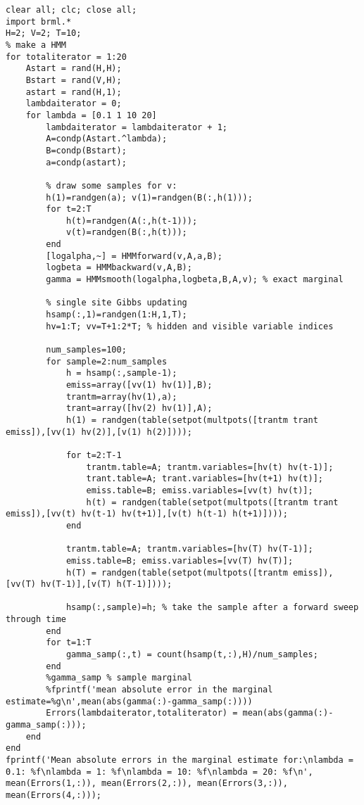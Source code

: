 \documentclass[11pt,a4paper,oneside]{report}
\begin{document}
\begin{lstlisting}
clear all; clc; close all;
import brml.*
H=2; V=2; T=10;
% make a HMM
for totaliterator = 1:20
    Astart = rand(H,H);
    Bstart = rand(V,H);
    astart = rand(H,1);
    lambdaiterator = 0;
    for lambda = [0.1 1 10 20]
        lambdaiterator = lambdaiterator + 1;
        A=condp(Astart.^lambda);
        B=condp(Bstart);
        a=condp(astart);

        % draw some samples for v:
        h(1)=randgen(a); v(1)=randgen(B(:,h(1)));
        for t=2:T
            h(t)=randgen(A(:,h(t-1)));  
            v(t)=randgen(B(:,h(t)));
        end
        [logalpha,~] = HMMforward(v,A,a,B); 
        logbeta = HMMbackward(v,A,B);
        gamma = HMMsmooth(logalpha,logbeta,B,A,v); % exact marginal

        % single site Gibbs updating
        hsamp(:,1)=randgen(1:H,1,T);
        hv=1:T; vv=T+1:2*T; % hidden and visible variable indices

        num_samples=100;
        for sample=2:num_samples
            h = hsamp(:,sample-1);
            emiss=array([vv(1) hv(1)],B);
            trantm=array(hv(1),a);
            trant=array([hv(2) hv(1)],A);
            h(1) = randgen(table(setpot(multpots([trantm trant emiss]),[vv(1) hv(2)],[v(1) h(2)])));

            for t=2:T-1
                trantm.table=A; trantm.variables=[hv(t) hv(t-1)];
                trant.table=A; trant.variables=[hv(t+1) hv(t)];
                emiss.table=B; emiss.variables=[vv(t) hv(t)];
                h(t) = randgen(table(setpot(multpots([trantm trant emiss]),[vv(t) hv(t-1) hv(t+1)],[v(t) h(t-1) h(t+1)])));
            end

            trantm.table=A; trantm.variables=[hv(T) hv(T-1)];
            emiss.table=B; emiss.variables=[vv(T) hv(T)];
            h(T) = randgen(table(setpot(multpots([trantm emiss]),[vv(T) hv(T-1)],[v(T) h(T-1)])));

            hsamp(:,sample)=h; % take the sample after a forward sweep through time
        end
        for t=1:T
            gamma_samp(:,t) = count(hsamp(t,:),H)/num_samples;
        end
        %gamma_samp % sample marginal
        %fprintf('mean absolute error in the marginal estimate=%g\n',mean(abs(gamma(:)-gamma_samp(:))))
        Errors(lambdaiterator,totaliterator) = mean(abs(gamma(:)-gamma_samp(:)));
    end
end
fprintf('Mean absolute errors in the marginal estimate for:\nlambda = 0.1: %f\nlambda = 1: %f\nlambda = 10: %f\nlambda = 20: %f\n', mean(Errors(1,:)), mean(Errors(2,:)), mean(Errors(3,:)), mean(Errors(4,:)));
\end{lstlisting}
\end{document}
